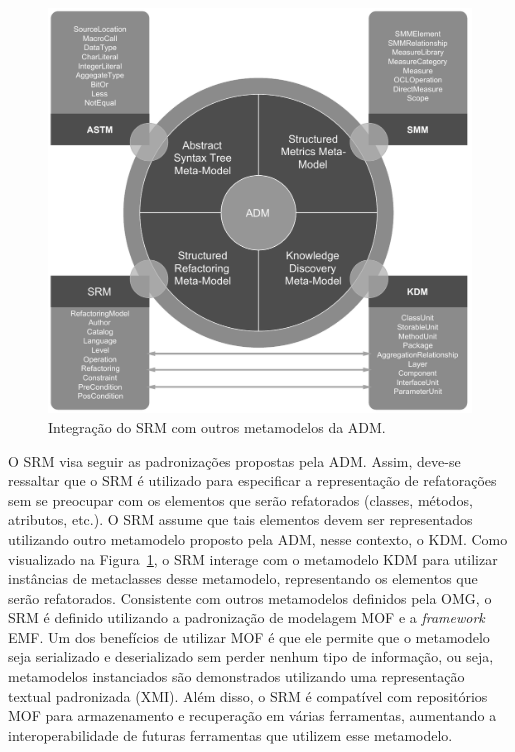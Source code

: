 \begin{figure}[h]
	\centering
	\caption{Integração do SRM com outros metamodelos da ADM.}
	\label{fig:refactoring_metamodel}
	\includegraphics[scale=0.6]{images/SRM2Formatted}
	\fautor
\end{figure}

O SRM visa seguir as padronizações propostas pela ADM. Assim, deve-se ressaltar que o SRM é utilizado para especificar a representação de refatorações sem se preocupar com os elementos que serão refatorados (classes, métodos, atributos, etc.). O SRM assume que tais elementos devem ser representados utilizando outro metamodelo proposto pela ADM, nesse contexto, o KDM. Como visualizado na Figura~\ref{fig:refactoring_metamodel}, o SRM interage com o metamodelo KDM para utilizar instâncias de metaclasses desse metamodelo, representando os elementos que serão refatorados. Consistente com outros metamodelos definidos pela OMG, o SRM é definido utilizando a padronização de modelagem MOF e a \textit{framework} EMF. Um dos benefícios de utilizar MOF é que ele permite que o metamodelo seja serializado e deserializado sem perder nenhum tipo de informação, ou seja, metamodelos instanciados são demonstrados utilizando uma representação textual padronizada (XMI). Além disso, o SRM é compatível com repositórios MOF para armazenamento e recuperação em várias ferramentas, aumentando a interoperabilidade de futuras ferramentas que utilizem esse metamodelo.

